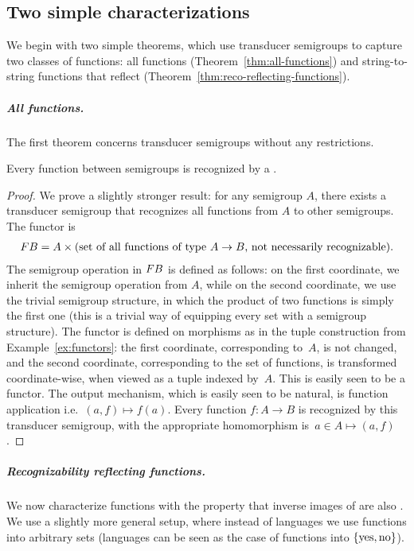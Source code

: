 \subsection{Two simple characterizations}
\label{sec:two-simple}

We begin with two simple theorems, which use transducer semigroups to capture
two classes of functions: all functions (Theorem~\ref{thm:all-functions}) and string-to-string functions that reflect  (Theorem~\ref{thm:reco-reflecting-functions}).

\subparagraph{All functions.} The first theorem concerns transducer semigroups without any restrictions.

\begin{theorem}\label{thm:all-functions} 
 Every function between semigroups is recognized by a .
\end{theorem}
\begin{proof}
 We prove a slightly stronger result: for any semigroup $A$, there exists a transducer semigroup that recognizes all functions from $A$ to other semigroups. The functor is 
 \begin{align*}
 \functor B = A \times \text{(set of all functions of type $A \to B$, not necessarily recognizable)}.
 \end{align*}
 \AP The semigroup operation in $\functor B$ is defined as follows: on the first coordinate, we inherit the semigroup operation from $A$, while on the second coordinate, we use the trivial  semigroup structure, in which  the product of two functions is simply the first one (this is a trivial way of equipping every set with a semigroup structure). The functor is defined on morphisms
as in the tuple construction from Example~\ref{ex:functors}: the first coordinate, corresponding to~$A$, is not changed, and the second coordinate, corresponding to the set of functions, is transformed coordinate-wise, when viewed as a tuple indexed by~$A$. This is easily seen to be a functor. The output mechanism, which is easily seen to be natural, is function application i.e.~$(a,f) \mapsto f(a)$.
Every function $f\colon A \to B$ is recognized by this transducer semigroup, with the appropriate homomorphism is~$a \in A \mapsto (a,f)$.
\end{proof}

\subparagraph{Recognizability reflecting functions.} We now characterize
functions with the property that inverse images of  are
also . We use a slightly more general setup, where instead of
languages we use functions into arbitrary sets (languages can be seen as the
case of functions into $\{\text{yes},\text{no}\}$).

